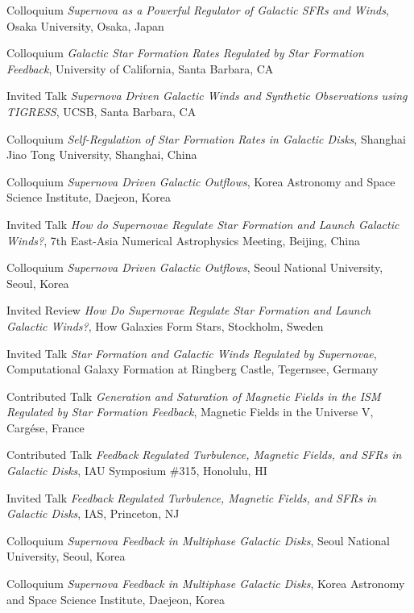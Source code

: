 \documentclass[12pt]{article}
\begin{document}
{Colloquium}
{\emph{Supernova as a Powerful Regulator of Galactic SFRs and Winds},
Osaka University,
Osaka, Japan}

{Colloquium}
{\emph{Galactic Star Formation Rates Regulated by Star Formation Feedback},
University of California,
Santa Barbara, CA}

{Invited Talk}
{\emph{Supernova Driven Galactic Winds and Synthetic Observations using TIGRESS},
UCSB,
Santa Barbara, CA}

{Colloquium}
{\emph{Self-Regulation of Star Formation Rates in Galactic Disks},
Shanghai Jiao Tong University,
Shanghai, China}

{Colloquium}
{\emph{Supernova Driven Galactic Outflows},
Korea Astronomy and Space Science Institute,
Daejeon, Korea}

{Invited Talk}
{\emph{How do Supernovae Regulate Star Formation and Launch Galactic Winds?},
7th East-Asia Numerical Astrophysics Meeting,
Beijing, China}

{Colloquium}
{\emph{Supernova Driven Galactic Outflows},
Seoul National University,
Seoul, Korea}

{Invited Review}
{\emph{How Do Supernovae Regulate Star Formation and Launch Galactic Winds?},
How Galaxies Form Stars,
Stockholm, Sweden}

{Invited Talk}
{\emph{Star Formation and Galactic Winds Regulated by Supernovae},
Computational Galaxy Formation at Ringberg Castle,
Tegernsee, Germany}

{Contributed Talk}
{\emph{Generation and Saturation of Magnetic Fields in the ISM Regulated by Star Formation Feedback},
Magnetic Fields in the Universe V,
Carg\'ese, France}

{Contributed Talk}
{\emph{Feedback Regulated Turbulence, Magnetic Fields, and SFRs in Galactic Disks},
IAU Symposium \#315,
Honolulu, HI}

{Invited Talk}
{\emph{Feedback Regulated Turbulence, Magnetic Fields, and SFRs in Galactic Disks},
IAS,
Princeton, NJ}

{Colloquium}
{\emph{Supernova Feedback in Multiphase Galactic Disks},
Seoul National University,
Seoul, Korea}

{Colloquium}
{\emph{Supernova Feedback in Multiphase Galactic Disks},
Korea Astronomy and Space Science Institute,
Daejeon, Korea}
\end{document}
